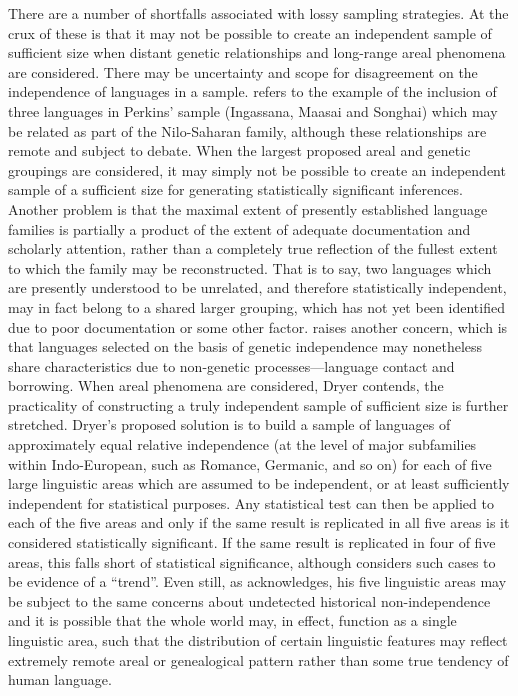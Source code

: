 There are a number of shortfalls associated with lossy sampling strategies. At the crux of these is that it may not be possible to create an independent sample of sufficient size when distant genetic relationships and long-range areal phenomena are considered. There may be uncertainty and scope for disagreement on the independence of languages in a sample. \textcite[p.~261]{dryer_large_1989} refers to the example of the inclusion of three languages in Perkins' sample (Ingassana, Maasai and Songhai) which may be related as part of the Nilo-Saharan family, although these relationships are remote and subject to debate. When the largest proposed areal and genetic groupings are considered, it may simply not be possible to create an independent sample of a sufficient size for generating statistically significant inferences. Another problem is that the maximal extent of presently established language families is partially a product of the extent of adequate documentation and scholarly attention, rather than a completely true reflection of the fullest extent to which the family may be reconstructed. That is to say, two languages which are presently understood to be unrelated, and therefore statistically independent, may in fact belong to a shared larger grouping, which has not yet been identified due to poor documentation or some other factor. \textcite[p.~263]{dryer_large_1989} raises another concern, which is that languages selected on the basis of genetic independence may nonetheless share characteristics due to non-genetic processes---language contact and borrowing. When areal phenomena are considered, Dryer contends, the practicality of constructing a truly independent sample of sufficient size is further stretched. Dryer's proposed solution is to build a sample of languages of approximately equal relative independence (at the level of major subfamilies within Indo-European, such as Romance, Germanic, and so on) for each of five large linguistic areas which are assumed to be independent, or at least sufficiently independent for statistical purposes. Any statistical test can then be applied to each of the five areas and only if the same result is replicated in all five areas is it considered statistically significant. If the same result is replicated in four of five areas, this falls short of statistical significance, although \textcite[pp.~272--273]{dryer_large_1989} considers such cases to be evidence of a ``trend''. Even still, as \textcite[p.~284]{dryer_large_1989} acknowledges, his five linguistic areas may be subject to the same concerns about undetected historical non-independence and it is possible that the whole world may, in effect, function as a single linguistic area, such that the distribution of certain linguistic features may reflect extremely remote areal or genealogical pattern rather than some true tendency of human language.

